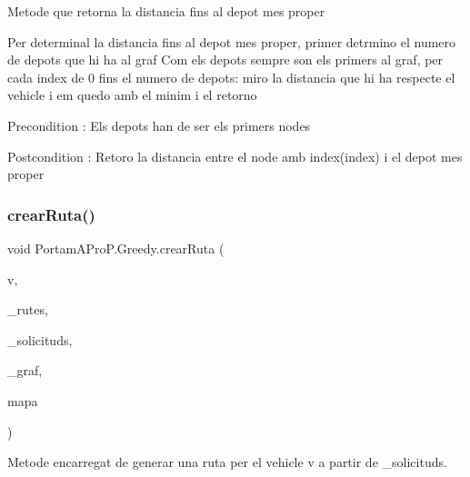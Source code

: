 Metode que retorna la distancia fins al depot mes proper \begin{DoxyVerb}Per determinal la distancia fins al depot mes proper, primer detrmino el numero
de depots que hi ha al graf
Com els depots sempre son els primers al graf, per cada index de 0 fins el numero de depots:
miro la distancia que hi ha respecte el vehicle i em quedo amb el minim i el retorno
\end{DoxyVerb}
 \begin{DoxyPrecond}{Precondition}
\+: Els depots han de ser els primers nodes 
\end{DoxyPrecond}
\begin{DoxyPostcond}{Postcondition}
\+: Retoro la distancia entre el node amb index(index) i el depot mes proper 
\end{DoxyPostcond}
\mbox{\label{class_portam_a_pro_p_1_1_greedy_a88ab480dd626665d2480220b3a032cc9}} 
\subsubsection{\texorpdfstring{crear\+Ruta()}{crearRuta()}}
{\footnotesize\ttfamily void Portam\+A\+Pro\+P.\+Greedy.\+crear\+Ruta (\begin{DoxyParamCaption}\item[{\hyperlink{class_portam_a_pro_p_1_1_vehicle}{Vehicle}}]{v,  }\item[{Array\+List$<$ \hyperlink{class_portam_a_pro_p_1_1_ruta}{Ruta} $>$}]{\+\_\+rutes,  }\item[{Sorted\+Set$<$ \hyperlink{class_portam_a_pro_p_1_1_peticio}{Peticio} $>$}]{\+\_\+solicituds,  }\item[{Graph}]{\+\_\+graf,  }\item[{\hyperlink{class_portam_a_pro_p_1_1_llegir_fitxer_graf}{Llegir\+Fitxer\+Graf}}]{mapa }\end{DoxyParamCaption})}



Metode encarregat de generar una ruta per el vehicle v a partir de \+\_\+solicituds. 

